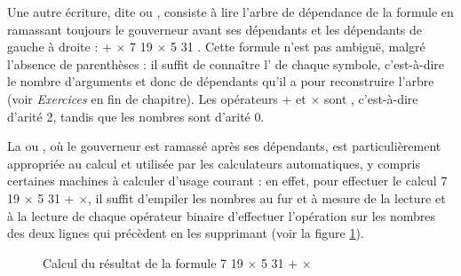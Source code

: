 {    Une autre écriture, dite  ou , consiste à lire l’arbre de dépendance de la formule en ramassant toujours le gouverneur avant ses dépendants et les dépendants de gauche à droite : + \textrm{${\times}$} 7 19 \textrm{${\times}$} 5 31 . Cette formule n’est pas ambiguë, malgré l’absence de parenthèses : il suffit de connaître l’ de chaque symbole, c’est-à-dire le nombre d’arguments et donc de dépendants qu’il a pour reconstruire l'arbre (voir \textit{Exercices} en fin de chapitre). Les opérateurs + et \textrm{${\times}$} sont , c’est-à-dire d’arité 2, tandis que les nombres sont d’arité 0.

    La \textstyleTermes{}  ou , où le gouverneur est ramassé après ses dépendants, est particulièrement appropriée au calcul et utilisée par les calculateurs automatiques, y compris certaines machines à calculer d’usage courant : en effet, pour effectuer le calcul 7 19 \textrm{${\times}$} 5 31 + \textrm{${\times}$}, il suffit d’empiler les nombres au fur et à mesure de la lecture et à la lecture de chaque opérateur binaire d’effectuer l’opération sur les nombres des deux lignes qui précèdent en les supprimant (voir la figure \ref{fig:formule-calcul2}).

\begin{figure}[H]
    \caption{Calcul du résultat de la formule  7 19 \textrm{${\times}$} 5 31 + \textrm{${\times}$}\label{fig:formule-calcul2}}
\end{figure}

}
